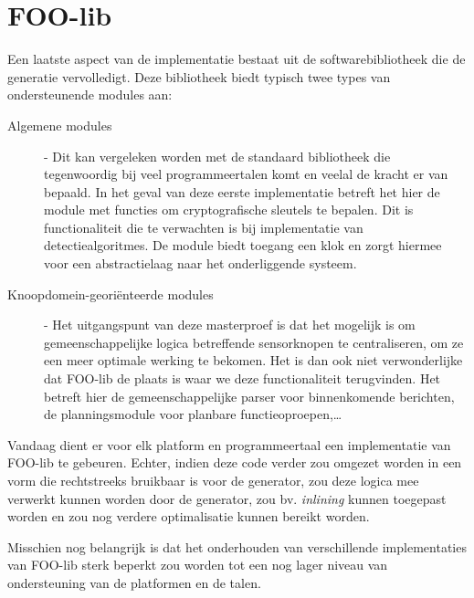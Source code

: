 
\section{FOO-lib}
\label{section:devel-foo-lib}

Een laatste aspect van de implementatie bestaat uit de softwarebibliotheek die
de generatie vervolledigt. Deze bibliotheek biedt typisch twee types van
ondersteunende modules aan:

\begin{description}

\item[Algemene modules] - Dit kan vergeleken worden met de standaard
bibliotheek die tegenwoordig bij veel programmeertalen komt en veelal de kracht
er van bepaald. In het geval van deze eerste implementatie betreft het hier de
 module met functies om cryptografische sleutels te bepalen. Dit is
functionaliteit die te verwachten is bij implementatie van detectiealgoritmes.
De  module biedt toegang een klok en zorgt hiermee voor een
abstractielaag naar het onderliggende systeem.

\item[Knoopdomein-geori\"enteerde modules] - Het uitgangspunt van deze
masterproef is dat het mogelijk is om gemeenschappelijke logica betreffende
sensorknopen te centraliseren, om ze een meer optimale werking te bekomen. Het
is dan ook niet verwonderlijke dat FOO-lib de plaats is waar we deze
functionaliteit terugvinden. Het betreft hier de gemeenschappelijke parser voor
binnenkomende berichten, de planningsmodule voor planbare functieoproepen,\dots

\end{description}

Vandaag dient er voor elk platform en programmeertaal een implementatie van
FOO-lib te gebeuren. Echter, indien deze code verder zou omgezet worden in een
vorm die rechtstreeks bruikbaar is voor de generator, zou deze logica mee
verwerkt kunnen worden door de generator, zou bv. \emph{inlining} kunnen
toegepast worden en zou nog verdere optimalisatie kunnen bereikt worden.

Misschien nog belangrijk is dat het onderhouden van verschillende
implementaties van FOO-lib sterk beperkt zou worden tot een nog lager niveau
van ondersteuning van de platformen en de talen.
